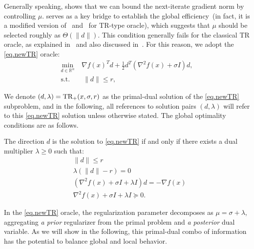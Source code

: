 \documentclass[moor,sglanonrev]{informs4}
\begin{document}
Generally speaking,  shows that we can bound the next-iterate gradient norm by controlling $\mu$.
    { serves as a key bridge to establish the global efficiency~(in fact, it is a modified version of~\cite[Lemma 4.2.5]{nesterov2018lectures} and~\cite[Corollary 1]{nesterov2021implementable} for TR-type oracle)}, which suggests that $\mu$ should be selected roughly as $\Theta(\|d\|)$. This condition generally fails for the classical TR oracle, as explained in~ and also discussed in~\cite{curtis2018concise,curtis2017trust}. For this reason, we adopt the \ref{eq.newTR} oracle:
\begin{equation}\label{eq.newTR}
    \tag{TR$_+$}
    \begin{aligned}
        \min_{d \in \mathbb{R}^n}~ & \nabla f(x)^T d
        + \tfrac{1}{2} d^T (\nabla^2 f(x) + \sigma I) d, \\
        \text{s.t.}                & ~ \|d\| \le r,
    \end{aligned}
\end{equation}

We denote $(d, \lambda) = \textrm{TR}_+(x, \sigma, r)$ as the primal-dual solution of the \ref{eq.newTR} subproblem, and in the following, all references to solution pairs $(d,\lambda)$ will refer to this \ref{eq.newTR} solution unless otherwise stated.
The global optimality conditions are as follows.
\begin{lemma}\label{lem.optimal condition}
    The direction $d$ is the solution to \ref{eq.newTR} if and only if there exists a dual multiplier $\lambda \geq 0$ such that: \begin{subequations}\label{eq.sa}
        \begin{align}
            \label{eq.optcond primal}
             & \| d\| \leq r                                            \\
            \label{eq.optcond coml slack}
             & \lambda \left(\|d\|-r \right)=0                          \\ \label{eq.optcond firstorder}
             & (\nabla^2 f(x) + \sigma I + \lambda I ) d = -\nabla f(x) \\
            \label{eq.optcond secondorder}
             & \nabla^2 f(x) + \sigma I + \lambda I \succeq 0.
        \end{align}
    \end{subequations}
\end{lemma}
In the \ref{eq.newTR} oracle, the regularization parameter decomposes as $\mu=\sigma+\lambda$, aggregating \emph{a prior} regularizer from the primal problem and \emph{a posterior} dual variable. As we will show in the following, this primal-dual combo of information has the potential to balance global and local behavior.
\end{document}
